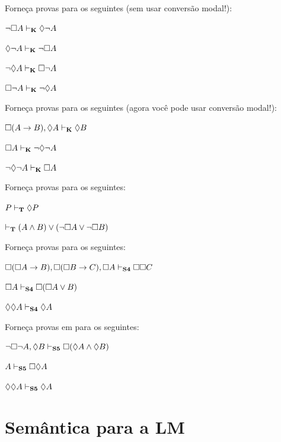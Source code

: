 \problempart
Forneça provas para os seguintes (sem usar conversão modal!):
\begin{compactlist}
	\item $\neg\Box A\vdash_{\mathbf{K}} \Diamond \neg A$
	\item $\Diamond\neg A\vdash_{\mathbf{K}}\neg \Box A$
	\item $\neg\Diamond A\vdash_{\mathbf{K}}\Box\neg A$
	\item $\Box\neg A\vdash_{\mathbf{K}}\neg\Diamond A$
\end{compactlist}

\problempart
Forneça provas para os seguintes (agora você pode usar conversão modal!):
\begin{compactlist}
	\item $\Box(A\rightarrow B), \Diamond A \vdash_{\mathbf{K}} \Diamond B$
	\item $\Box A \vdash_{\mathbf{K}} \neg\Diamond\neg A$
	\item $\neg\Diamond\neg A \vdash_{\mathbf{K}} \Box A$
\end{compactlist}

\problempart
Forneça provas para os seguintes:
\begin{compactlist}
	\item $P\vdash_{\mathbf{T}}\Diamond P$
	\item $\vdash_{\mathbf{T}} (A\wedge B)\vee(\neg \Box A\vee\neg\Box B)$
\end{compactlist}

\problempart
Forneça provas para os seguintes:
\begin{compactlist}
	\item $\Box(\Box A\rightarrow B), \Box (\Box B\rightarrow C), \Box A \vdash_{\mathbf{S4}} \Box\Box C$
	\item $\Box A \vdash_{\mathbf{S4}} \Box(\Box A \vee B)$
	\item $\Diamond \Diamond A \vdash_{\mathbf{S4}} \Diamond A$
\end{compactlist}


\problempart
Forneça provas em \mlSfive{} para os seguintes:
\begin{compactlist}
	\item $\neg\Box\neg A, \Diamond B\vdash_{\mathbf{S5}} \Box(\Diamond A \wedge \Diamond B)$
	\item $A \vdash_{\mathbf{S5}}  \Box\Diamond A$
	\item $\Diamond\Diamond A\vdash_{\mathbf{S5}}  \Diamond A$
\end{compactlist}


\chapter{Semântica para a LM}
\label{Semantics}

